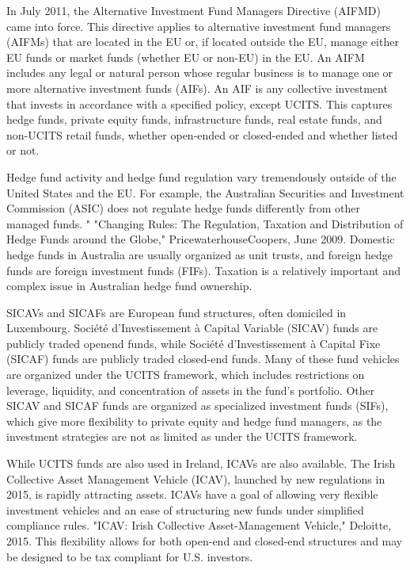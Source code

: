 \documentclass[11pt]{article}
\begin{document}
In July 2011, the Alternative Investment Fund Managers Directive (AIFMD) came into force. This directive applies to alternative investment fund managers (AIFMs) that are located in the EU or, if located outside the EU, manage either EU funds or market funds (whether EU or non-EU) in the EU. An AIFM includes any legal or natural person whose regular business is to manage one or more alternative investment funds (AIFs). An AIF is any collective investment that invests in accordance with a specified policy, except UCITS. This captures hedge funds, private equity funds, infrastructure funds, real estate funds, and non-UCITS retail funds, whether open-ended or closed-ended and whether listed or not.

Hedge fund activity and hedge fund regulation vary tremendously outside of the United States and the EU. For example, the Australian Securities and Investment Commission (ASIC) does not regulate hedge funds differently from other managed funds. " "Changing Rules: The Regulation, Taxation and Distribution of Hedge Funds around the Globe," PricewaterhouseCoopers, June 2009. Domestic hedge funds in Australia are usually organized as unit trusts, and foreign hedge funds are foreign investment funds (FIFs). Taxation is a relatively important and complex issue in Australian hedge fund ownership.

SICAVs and SICAFs are European fund structures, often domiciled in Luxembourg. Société d'Investissement à Capital Variable (SICAV) funds are publicly traded openend funds, while Société d'Investissement à Capital Fixe (SICAF) funds are publicly traded closed-end funds. Many of these fund vehicles are organized under the UCITS framework, which includes restrictions on leverage, liquidity, and concentration of assets in the fund's portfolio. Other SICAV and SICAF funds are organized as specialized investment funds (SIFs), which give more flexibility to private equity and hedge fund managers, as the investment strategies are not as limited as under the UCITS framework.

While UCITS funds are also used in Ireland, ICAVs are also available. The Irish Collective Asset Management Vehicle (ICAV), launched by new regulations in 2015, is rapidly attracting assets. ICAVs have a goal of allowing very flexible investment vehicles and an ease of structuring new funds under simplified compliance rules. "ICAV: Irish Collective Asset-Management Vehicle," Deloitte, 2015. This flexibility allows for both open-end and closed-end structures and may be designed to be tax compliant for U.S. investors.
\end{document}
